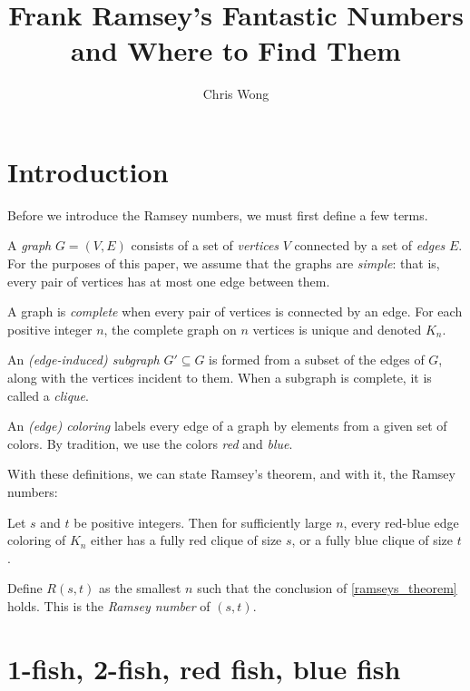 \documentclass{article}
\begin{document}
\author{Chris Wong}
\title{Frank Ramsey's Fantastic Numbers and Where to Find Them}
\maketitle


\section{Introduction}

Before we introduce the Ramsey numbers, we must first define a few terms.

A \textit{graph} $G = (V, E)$ consists of a set of \textit{vertices} $V$ connected by a set of \textit{edges} $E$. For the purposes of this paper, we assume that the graphs are \textit{simple}: that is, every pair of vertices has at most one edge between them.

A graph is \textit{complete} when every pair of vertices is connected by an edge. For each positive integer $n$, the complete graph on $n$ vertices is unique and denoted $K_n$.

An \textit{(edge-induced) subgraph} $G' \subseteq G$ is formed from a subset of the edges of $G$, along with the vertices incident to them. When a subgraph is complete, it is called a \textit{clique}.

An \textit{(edge) coloring} labels every edge of a graph by elements from a given set of colors. By tradition, we use the colors \textit{red} and \textit{blue}.

With these definitions, we can state Ramsey's theorem, and with it, the Ramsey numbers:

\begin{Theorem} \label{ramseys_theorem}
    Let $s$ and $t$ be positive integers. Then for sufficiently large $n$, every red-blue edge coloring of $K_n$ either has a fully red clique of size $s$, or a fully blue clique of size $t$.
\end{Theorem}

\begin{Definition}
    Define $R(s,t)$ as the smallest $n$ such that the conclusion of \cref{ramseys_theorem} holds. This is the \textit{Ramsey number} of $(s,t)$.
\end{Definition}


\section{1-fish, 2-fish, red fish, blue fish}
\end{document}

